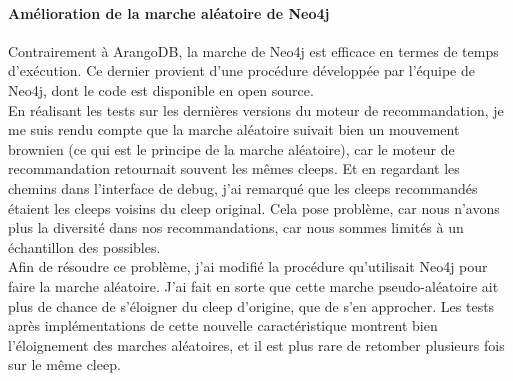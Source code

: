 \documentclass{article} %
\begin{document}
\newpage
\paragraph{Amélioration de la marche aléatoire de Neo4j\\}
Contrairement à ArangoDB, la marche de Neo4j est efficace en termes de temps d'exécution. Ce dernier provient d'une procédure développée par l'équipe de Neo4j, dont le code est disponible en open source.\\
En réalisant les tests sur les dernières versions du moteur de recommandation, je me suis rendu compte que la marche aléatoire suivait bien un mouvement brownien (ce qui est le principe de la marche aléatoire), car le moteur de recommandation retournait souvent les mêmes cleeps. Et en regardant les chemins dans l'interface de debug, j'ai remarqué que les cleeps recommandés étaient les cleeps voisins du cleep original. Cela pose problème, car nous n'avons plus la diversité dans nos recommandations, car nous sommes limités à un échantillon des possibles.\\
Afin de résoudre ce problème, j'ai modifié la procédure qu'utilisait Neo4j pour faire la marche aléatoire. J'ai fait en sorte que cette marche pseudo-aléatoire ait plus de chance de s'éloigner du cleep d'origine, que de s'en approcher. Les tests après implémentations de cette nouvelle caractéristique montrent bien l'éloignement des marches aléatoires, et il est plus rare de retomber plusieurs fois sur le même cleep.
\end{document}

